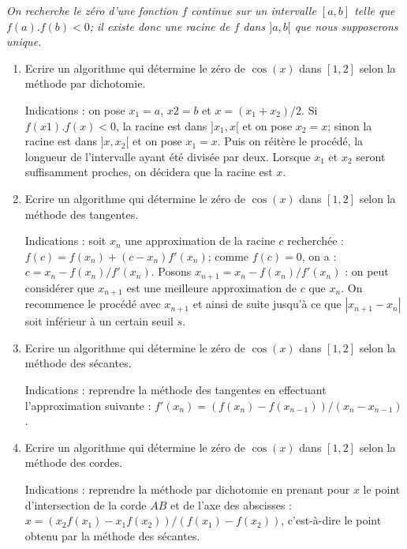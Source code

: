 \begin{td}\label{td:zero}\em {}
On recherche le zéro d'une fonction $f$ continue sur un 
intervalle $[a,b]$ telle que $f(a).f(b) < 0$;
il existe donc une racine de $f$ dans $]a,b[$ que nous supposerons 
unique. 

\begin{enumerate}
\item Ecrire un algorithme qui détermine le zéro de $\cos(x)$ dans $[1,2]$
	selon la méthode par dichotomie.
	
	Indications : on pose $x_1 = a$, $x2 = b$ et $x = (x_1+x_2)/2$. 
	Si $f(x1).f(x) < 0$, la racine est dans $]x_1,x[$ et on pose $x_2 = x$; 
	sinon la racine est dans $]x,x_2[$ et on pose $x_1 = x$. 
	Puis on réitère le procédé, la longueur de l'intervalle ayant été 
	divisée par deux. Lorsque $x_1$ et $x_2$ seront suffisamment proches, 
	on décidera que la racine est $x$.
	
\item Ecrire un algorithme qui détermine le zéro de $\cos(x)$ dans $[1,2]$
	selon la méthode des tangentes.
	
	Indications : soit $x_n$ une approximation de la racine $c$ recherchée : 
	$f(c) = f(x_n) + (c-x_n)f'(x_n)$; comme $f(c) = 0$, on a : 
	$c = x_n - f(x_n)/f'(x_n)$. Posons $x_{n+1} = x_n - f(x_n)/f'(x_n)$ : 
	on peut considérer que $x_{n+1}$ est une meilleure approximation de $c$ que 
	$x_n$. On recommence le procédé avec $x_{n+1}$  et ainsi de suite jusqu'à ce 
	que $|x_{n+1}-x_n|$ soit inférieur à un certain seuil $s$.
	
\item Ecrire un algorithme qui détermine le zéro de $\cos(x)$ dans $[1,2]$
	selon la méthode des sécantes.

	Indications : reprendre la méthode des tangentes en effectuant 
	l'approximation suivante : $f'(x_n) = (f(x_n)-f(x_{n-1}))/(x_n-x_{n-1})$.
\item Ecrire un algorithme qui détermine le zéro de $\cos(x)$ dans $[1,2]$
	selon la méthode des cordes.

	Indications : reprendre la méthode par dichotomie en prenant pour $x$ 
	le point d'intersection de la corde $AB$ et de l'axe des abscisses : 
	$x = (x_2f(x_1) - x_1f(x_2))/(f(x_1)-f(x_2))$, c'est-à-dire le point obtenu 
	par la méthode des sécantes.

\end{enumerate}
\end{td}

